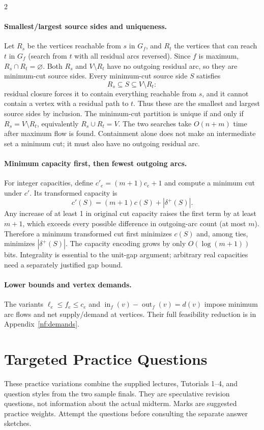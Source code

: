 \documentclass[10pt]{article}
\theoremstyle{definition}
\begin{document}
\begin{multicols*}{2}
\paragraph{Smallest/largest source sides and uniqueness.}
Let $R_s$ be the vertices reachable from $s$ in $G_f$, and $R_t$ the
vertices that can reach $t$ in $G_f$ (search from $t$ with all residual
arcs reversed). Since $f$ is maximum, $R_s\cap R_t=\varnothing$.
Both $R_s$ and $V\setminus R_t$ have no outgoing residual arc, so they
are minimum-cut source sides. Every minimum-cut source side $S$ satisfies
\[
 R_s\subseteq S\subseteq V\setminus R_t:
\]
residual closure forces it to contain everything reachable from $s$,
and it cannot contain a vertex with a residual path to $t$.
Thus these are the smallest and largest source sides by inclusion.
The minimum-cut partition is unique if and only if
$R_s=V\setminus R_t$, equivalently $R_s\cup R_t=V$.
The two searches take $O(n+m)$ time after maximum flow is found.
Containment alone does not make an intermediate set a minimum cut;
it must also have no outgoing residual arc.

\paragraph{Minimum capacity first, then fewest outgoing arcs.}
For integer capacities, define $c'_e=(m+1)c_e+1$ and compute a minimum cut
under $c'$. Its transformed capacity is
\[
 c'(S)=(m+1)c(S)+|\delta^+(S)|.
\]
Any increase of at least 1 in original cut capacity raises the first term
by at least $m+1$, which exceeds every possible difference in outgoing-arc
count (at most $m$). Therefore a minimum transformed cut first minimizes
$c(S)$ and, among ties, minimizes $|\delta^+(S)|$. The capacity encoding grows
by only $O(\log(m+1))$ bits. Integrality is essential to the unit-gap argument;
arbitrary real capacities need a separately justified gap bound.\par


\paragraph{Lower bounds and vertex demands.}
The variants $\ell_e\le f_e\le c_e$ and
$\operatorname{in}_f(v)-\operatorname{out}_f(v)=d(v)$ impose minimum arc flows
and net supply/demand at vertices. Their full feasibility reduction is in
Appendix~\ref{nf:demands}.


\clearpage\appendix

\section{Targeted Practice Questions}\label{prac:questions}\label{prac:main}
These practice variations combine the supplied lectures, Tutorials 1--4,
and question styles from the two sample finals.  They are speculative
revision questions, not information about the actual midterm.  Marks are
suggested practice weights.  Attempt the questions before consulting the
separate answer sketches.


\end{multicols*}
\end{document}
